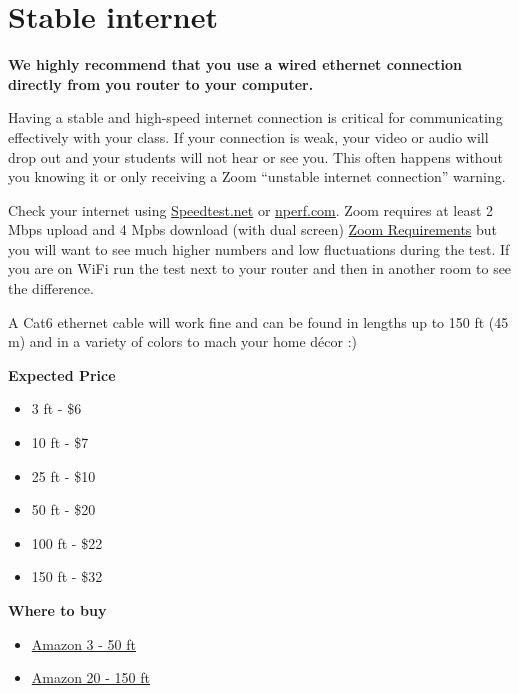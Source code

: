 \section{Stable internet}
\label{sec:equipment::internet}
\textbf{We highly recommend that you use a wired ethernet connection directly from you router to your computer.}

Having a stable and high-speed internet connection is critical for communicating effectively with your class. 
If your connection is weak, your video or audio will drop out and your students will not hear or see you.
This often happens without you knowing it or only receiving a Zoom ``unstable internet connection'' warning.

\begin{note}
	Check your internet using \href{https://www.speedtest.net}{Speedtest.net} or \href{https://www.nperf.com/en/}{nperf.com}. 
	Zoom requires at least 2 Mbps upload and 4 Mpbs download (with dual screen) \href{https://support.zoom.us/hc/en-us/articles/204003179-System-Requirements-for-Zoom-Rooms}{Zoom Requirements} 
	but you will want to see much higher numbers and low fluctuations during the test. If you are on WiFi run the test next to your router 
	and then in another room to see the difference.
\end{note}
 
A Cat6 ethernet cable will work fine and can be found in lengths up to 150 ft (45 m) and in a variety of colors to mach your home d\'{e}cor :)

\textbf{Expected Price}
\begin{itemize}
	\item 3 ft - \$6
	\item 10 ft - \$7
	\item 25 ft - \$10
	\item 50 ft - \$20
	\item 100 ft - \$22
	\item 150 ft - \$32
\end{itemize}

\textbf{Where to buy}
\begin{itemize}
\item \href{https://www.amazon.com/AmazonBasics-RJ45-Cat-6-Ethernet-Patch-Cable-10-Feet-3-Meters/dp/B0134QJH4G/ref=sr_1_5?dchild=1&keywords=cat6%2Bethernet%2Bcable&qid=1597264670&sr=8-5&th=1}{Amazon 3 - 50 ft}
%
\item \href{https://www.amazon.com/Cable-Matters-Snagless-Ethernet-Black/dp/B007NZGPAY/ref=sr_1_3?dchild=1&keywords=cat6%2Bethernet%2Bcable&qid=1597264670&sr=8-3&th=1}{Amazon 20 - 150 ft}
\end{itemize}

